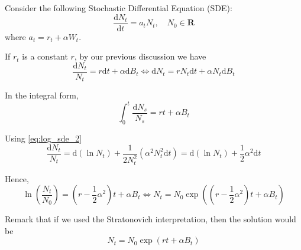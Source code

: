 \begin{example}\label{ex:pop-growth}
    Consider the following Stochastic Differential Equation (SDE):
    \[
        \frac{\mathrm{d} N_t}{\mathrm{d}t} = a_t N_t, \quad N_0 \in \textbf{R}
    \]
    where $a_t = r_t + \alpha W_t$. 

    If $r_t$ is a constant $r$, by our previous discussion we have
    \begin{equation*}
        \frac{\mathrm{d} N_t}{N_t} = r \mathrm{d}t + \alpha \mathrm{d}B_t \iff \mathrm{d}N_t = rN_t \mathrm{d}t + \alpha N_t \mathrm{d} B_t
    \end{equation*}

    In the integral form,
    \begin{equation*}
        \int_0^t \frac{\mathrm{d} N_s}{N_s} = rt + \alpha B_t
    \end{equation*}

    Using \eqref{eq:log_sde_2}
    \begin{equation*}
        \frac{\mathrm{d} N_t}{N_t} = \mathrm{d}(\ln N_t) + \frac{1}{2 N_t^2} \left( \alpha^2 N_t^2 \mathrm{d}t \right) = \mathrm{d}(\ln N_t) + \frac{1}{2}\alpha^2 \mathrm{d}t
    \end{equation*}

    Hence, 
    \begin{equation*}
        \ln \left( \frac{N_t}{N_0} \right) = \left( r - \frac{1}{2} \alpha^2 \right)t + \alpha B_t \iff N_t = N_0 \exp \left( \left( r - \frac{1}{2}\alpha^2 \right) t + \alpha B_t \right)
    \end{equation*}

    Remark that if we used the Stratonovich interpretation, then the solution would be
    \[
        N_t = N_0 \exp (rt + \alpha B_t)
    \]
\end{example}


